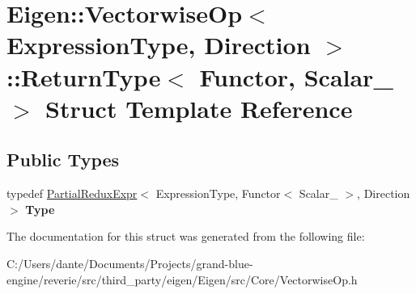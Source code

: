 \hypertarget{struct_eigen_1_1_vectorwise_op_1_1_return_type}{}\section{Eigen\+::Vectorwise\+Op$<$ Expression\+Type, Direction $>$\+::Return\+Type$<$ Functor, Scalar\+\_\+ $>$ Struct Template Reference}
\label{struct_eigen_1_1_vectorwise_op_1_1_return_type}
\subsection*{Public Types}
\begin{DoxyCompactItemize}
\item 
\mbox{\label{struct_eigen_1_1_vectorwise_op_1_1_return_type_a980e83210b2fceea517d74a0d3a8d783}} 
typedef \mbox{\hyperlink{class_eigen_1_1_partial_redux_expr}{Partial\+Redux\+Expr}}$<$ Expression\+Type, Functor$<$ Scalar\+\_\+ $>$, Direction $>$ {\bfseries Type}
\end{DoxyCompactItemize}


The documentation for this struct was generated from the following file\+:\begin{DoxyCompactItemize}
\item 
C\+:/\+Users/dante/\+Documents/\+Projects/grand-\/blue-\/engine/reverie/src/third\+\_\+party/eigen/\+Eigen/src/\+Core/Vectorwise\+Op.\+h\end{DoxyCompactItemize}
